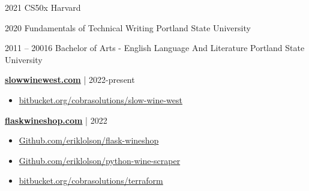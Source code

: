 \documentclass[9pt]{developercv} %
\begin{document}
	\vspace{56pt}
\begin{entrylist}
	\entry
		{2021}
		{CS50x}
		{Harvard}
		
	\entry
		{2020}
		{Fundamentals of Technical Writing}
		{Portland State University}

	\entry
		{2011 -- 20016}
		{Bachelor of Arts - English Language And Literature}
		{Portland State University}

\end{entrylist}

\vspace{0.5cm}
\begin{minipage}[t]{0.45\textwidth}
	{\href{https://slowwinewest.com}{\bfseries slowwinewest.com}} | {2022-present}
		\begin{itemize}
   			\item {\href{https://bitbucket.org/cobrasolutions/slow-wine-west}{bitbucket.org/cobrasolutions/slow-wine-west}}
		\end{itemize}
\end{minipage}%
\hfill
\begin{minipage}[t]{0.45\textwidth}
		{\href{https://flaskwineshop.com}{\bfseries flaskwineshop.com}} | {2022}
            \begin{itemize}
                \item {\href{https://Github.com/eriklolson/flask-wineshop}{Github.com/eriklolson/flask-wineshop}}
                \item {\href{https://Github.com/eriklolson/python-wine-scraper}{Github.com/eriklolson/python-wine-scraper}}
                \item {\href{https://bitbucket.org/cobrasolutions/terraform}{bitbucket.org/cobrasolutions/terraform}}
            \end{itemize}
            
\end{minipage}%
	\vspace{44pt}
\end{document}
